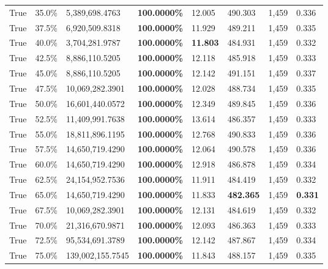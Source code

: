 \begin{table}[H]
\begin{tabular}{lllrllll}
\cline{1-8}
True & 35.0\% & 5,389,698.4763 & \bfseries \color{red} 100.0000\% & 12.005 & 490.303 & 1,459 & 0.336 \\
\cline{1-8}
True & 37.5\% & 6,920,509.8318 & \bfseries \color{red} 100.0000\% & 11.929 & 489.211 & 1,459 & 0.335 \\
\cline{1-8}
True & 40.0\% & 3,704,281.9787 & \bfseries \color{red} 100.0000\% & \bfseries \color{red} 11.803 & 484.931 & 1,459 & 0.332 \\
\cline{1-8}
True & 42.5\% & 8,886,110.5205 & \bfseries \color{red} 100.0000\% & 12.118 & 485.918 & 1,459 & 0.333 \\
\cline{1-8}
True & 45.0\% & 8,886,110.5205 & \bfseries \color{red} 100.0000\% & 12.142 & 491.151 & 1,459 & 0.337 \\
\cline{1-8}
True & 47.5\% & 10,069,282.3901 & \bfseries \color{red} 100.0000\% & 12.028 & 488.734 & 1,459 & 0.335 \\
\cline{1-8}
True & 50.0\% & 16,601,440.0572 & \bfseries \color{red} 100.0000\% & 12.349 & 489.845 & 1,459 & 0.336 \\
\cline{1-8}
True & 52.5\% & 11,409,991.7638 & \bfseries \color{red} 100.0000\% & 13.614 & 486.357 & 1,459 & 0.333 \\
\cline{1-8}
True & 55.0\% & 18,811,896.1195 & \bfseries \color{red} 100.0000\% & 12.768 & 490.833 & 1,459 & 0.336 \\
\cline{1-8}
True & 57.5\% & 14,650,719.4290 & \bfseries \color{red} 100.0000\% & 12.064 & 490.578 & 1,459 & 0.336 \\
\cline{1-8}
True & 60.0\% & 14,650,719.4290 & \bfseries \color{red} 100.0000\% & 12.918 & 486.878 & 1,459 & 0.334 \\
\cline{1-8}
True & 62.5\% & 24,154,952.7536 & \bfseries \color{red} 100.0000\% & 11.911 & 484.419 & 1,459 & 0.332 \\
\cline{1-8}
True & 65.0\% & 14,650,719.4290 & \bfseries \color{red} 100.0000\% & 11.833 & \bfseries \color{red} 482.365 & 1,459 & \bfseries \color{red} 0.331 \\
\cline{1-8}
True & 67.5\% & 10,069,282.3901 & \bfseries \color{red} 100.0000\% & 12.131 & 484.619 & 1,459 & 0.332 \\
\cline{1-8}
True & 70.0\% & 21,316,670.9871 & \bfseries \color{red} 100.0000\% & 12.093 & 486.363 & 1,459 & 0.333 \\
\cline{1-8}
True & 72.5\% & 95,534,691.3789 & \bfseries \color{red} 100.0000\% & 12.142 & 487.867 & 1,459 & 0.334 \\
\cline{1-8}
True & 75.0\% & 139,002,155.7545 & \bfseries \color{red} 100.0000\% & 11.843 & 488.157 & 1,459 & 0.335 \\

\end{tabular}
\end{table}

